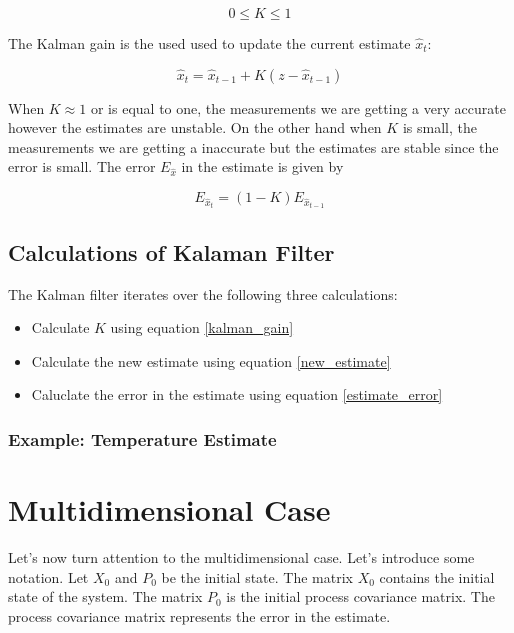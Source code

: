 \begin{equation}
0 \leq K \leq 1
\label{kalman_gain_condition}
\end{equation} 

The Kalman gain is the used used to update the current estimate $\hat{x}_t$:

\begin{equation}
\hat{x}_t = \hat{x}_{t-1} + K (z - \hat{x}_{t-1})
\label{new_estimate}
\end{equation} 


When $K \approx 1$ or is equal to one, the measurements we are getting a very accurate however the estimates are unstable. On the other hand when $K$ is small, 
the measurements we are getting a inaccurate but the estimates are stable since the error is small.
The error $E_{\hat{x}}$ in the estimate is given by 

\begin{equation}
E_{\hat{x}_t} = (1-K)E_{\hat{x}_{t-1}}
\label{estimate_error}
\end{equation}

\subsection{Calculations of Kalaman Filter}
The Kalman filter iterates over the following three calculations:

\begin{itemize}
\item Calculate $K$ using equation \ref{kalman_gain}
\item Calculate the new estimate using equation \ref{new_estimate} 
\item Caluclate the error in the estimate using equation \ref{estimate_error}
\end{itemize}


\subsubsection{Example: Temperature Estimate}



\section{Multidimensional Case}

Let's now turn attention to the multidimensional case. Let's introduce some notation. Let $X_0$ and $P_0$ be the initial state.
The matrix $X_0$ contains the initial state of the system. The matrix $P_0$ is the initial process covariance matrix. The process
covariance matrix represents the error in the estimate.


